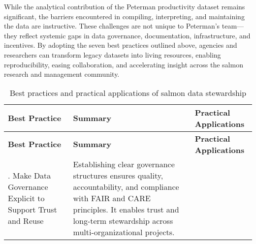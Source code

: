 \documentclass[
  letterpaper,
  DIV=11,
  numbers=noendperiod]{scrartcl}
\begin{document}
While the analytical contribution of the Peterman productivity dataset
remains significant, the barriers encountered in compiling,
interpreting, and maintaining the data are instructive. These challenges
are not unique to Peterman's team---they reflect systemic gaps in data
governance, documentation, infrastructure, and incentives. By adopting
the seven best practices outlined above, agencies and researchers can
transform legacy datasets into living resources, enabling
reproducibility, easing collaboration, and accelerating insight across
the salmon research and management community.

\begin{longtable}[]{@{}
  >{\raggedright\arraybackslash}p{}
  >{\raggedright\arraybackslash}p{}
  >{\raggedright\arraybackslash}p{}@{}}
\caption{Best practices and practical applications of salmon data
stewardship}\label{tbl-bestpractices}\tabularnewline
\toprule\noalign{}
\begin{minipage}[b]{\linewidth}\raggedright
\textbf{Best Practice}
\end{minipage} & \begin{minipage}[b]{\linewidth}\raggedright
\textbf{Summary}
\end{minipage} & \begin{minipage}[b]{\linewidth}\raggedright
\textbf{Practical Applications}
\end{minipage} \\
\midrule\noalign{}
\endfirsthead
\toprule\noalign{}
\begin{minipage}[b]{\linewidth}\raggedright
\textbf{Best Practice}
\end{minipage} & \begin{minipage}[b]{\linewidth}\raggedright
\textbf{Summary}
\end{minipage} & \begin{minipage}[b]{\linewidth}\raggedright
\textbf{Practical Applications}
\end{minipage} \\
\midrule\noalign{}
\endhead
\bottomrule\noalign{}
\endlastfoot
1. Make Data Governance Explicit to Support Trust and Reuse &
Establishing clear governance structures ensures quality,
accountability, and compliance with FAIR and CARE principles. It enables
trust and long-term stewardship across multi-organizational projects. &
\begin{minipage}[t]{\linewidth}\raggedright

\end{minipage}
\end{longtable}
\end{document}
